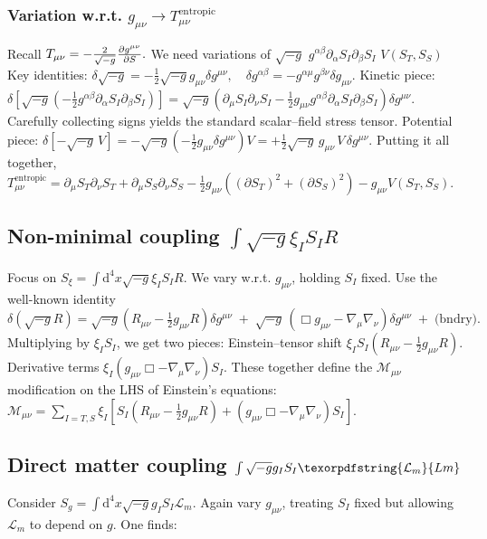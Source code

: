 \documentclass[11pt,a4paper]{article}
\newcommand{\Mmu}{\mathcal{M}}
\newcommand{\ST}{S_T}
\newcommand{\SSp}{S_S}
\newcommand{\Lm}{\mathcal{L}_m}
\newcommand{\Tmnentropic}{T^{\text{entropic}}_{\mu\nu}}
\newcommand{\Tmu}{T_{\mu\nu}}
\begin{document}
\subsubsection{Variation w.r.t. $g_{\mu\nu}\to\Tmnentropic$}
\label{app:1.2}
Recall
$\Tmu=-\frac{2}{\sqrt{-g}}\pdv{g^{\mu\nu}}{S}.$
We need variations of
$\sqrt{-g}$
$g^{\alpha\beta}\partial_\alpha S_I\partial_\beta S_I$
$V(\ST,\SSp)$
Key identities:
$\delta\sqrt{-g}=-\frac{1}{2}\sqrt{-g}g_{\mu\nu}\delta g^{\mu\nu},\quad \delta g^{\alpha\beta}=-g^{\alpha\mu}g^{\beta\nu}\delta g_{\mu\nu}.$
Kinetic piece:
$\delta\left[\sqrt{-g}\left(-\frac{1}{2}g^{\alpha\beta}\partial_\alpha S_I\partial_\beta S_I\right)\right]=\sqrt{-g}\left(\partial_\mu S_I\partial_\nu S_I-\frac{1}{2}g_{\mu\nu}g^{\alpha\beta}\partial_\alpha S_I\partial_\beta S_I\right)\delta g^{\mu\nu}.$
Carefully collecting signs yields the standard scalar–field stress tensor.
Potential piece:
$\delta[-\sqrt{-g}\,V] = -\sqrt{-g}\left(-\frac{1}{2}g_{\mu\nu}\delta g^{\mu\nu}\right)V = +\frac{1}{2}\sqrt{-g}\,g_{\mu\nu}\,V\,\delta g^{\mu\nu}.$
Putting it all together,
$\Tmnentropic=\partial_\mu\ST\partial_\nu\ST+\partial_\mu\SSp\partial_\nu\SSp-\frac{1}{2}g_{\mu\nu}\left((\partial\ST)^2+(\partial\SSp)^2\right)-g_{\mu\nu}V(\ST,\SSp).$

\subsection{Non-minimal coupling $\int\sqrt{-g}\xi_I S_I R$}
\label{app:2.2}
Focus on
$S_\xi=\int\text{d}^4x\sqrt{-g}\xi_I S_I R.$
We vary w.r.t. $g_{\mu\nu}$, holding $S_I$ fixed. Use the well-known identity
$\delta(\sqrt{-g}R) =\sqrt{-g}\left(R_{\mu\nu}-\frac{1}{2}g_{\mu\nu}R\right)\delta g^{\mu\nu} \;+\;\sqrt{-g}\,\left(\Box g_{\mu\nu}-\nabla_\mu\nabla_\nu\right)\delta g^{\mu\nu} \;+\;\text{(bndry)}.$
Multiplying by $\xi_I S_I$, we get two pieces:
Einstein–tensor shift
$\xi_I S_I(R_{\mu\nu}-\frac{1}{2}g_{\mu\nu}R).$
Derivative terms
$\xi_I(g_{\mu\nu}\Box-\nabla_\mu\nabla_\nu)S_I.$
These together define the $\Mmu_{\mu\nu}$ modification on the LHS of Einstein's equations:
$\Mmu_{\mu\nu}=\sum_{I=T,S}\xi_I\left[S_I(R_{\mu\nu}-\frac{1}{2}g_{\mu\nu}R)+(g_{\mu\nu}\Box-\nabla_\mu\nabla_\nu)S_I\right].$

\subsection{Direct matter coupling $\int\sqrt{-g}g_I S_I\texorpdfstring{\Lm}{Lm}$}
\label{app:2.3}
Consider
$S_g=\int\text{d}^4x\sqrt{-g}g_I S_I\Lm.$
Again vary $g_{\mu\nu}$, treating $S_I$ fixed but allowing $\Lm$ to depend on $g$. One finds:
\end{document}
